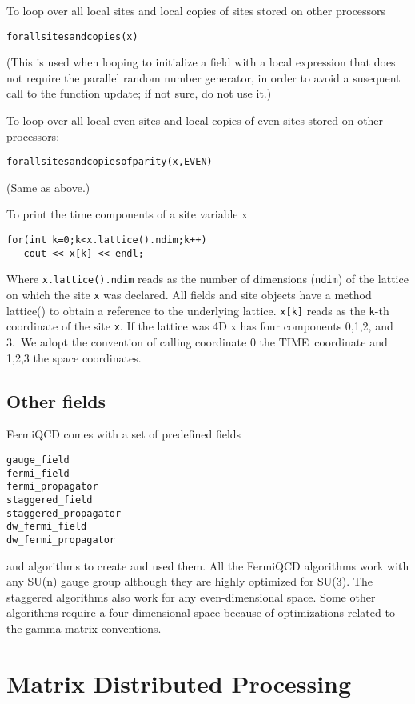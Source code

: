 To loop over all local sites and local copies of sites stored on other
processors
\begin{verbatim}
forallsitesandcopies(x)
\end{verbatim}

(This is used when looping to initialize a field with a local expression
that does not require the parallel random number generator, in order to
avoid a susequent call to the function update; if not sure, do not use it.)

To loop over all local even sites and local copies of even sites stored on
other processors:
\begin{verbatim}
forallsitesandcopiesofparity(x,EVEN)
\end{verbatim}

(Same as above.)

To print the time components of a site variable x
\begin{verbatim}
for(int k=0;k<x.lattice().ndim;k++)
   cout << x[k] << endl;
\end{verbatim}

Where {\tt x.lattice().ndim} reads as the number of dimensions ({\tt ndim})
of the lattice on which the site {\tt x} was declared. All fields and site
objects have a method lattice() to obtain a reference to the underlying
lattice. {\tt x[k]} reads as the {\tt k}-th coordinate of the site {\tt x}.
If the lattice was 4D x has four components 0,1,2, and 3.\ We adopt the
convention of calling coordinate 0 the TIME\ coordinate and 1,2,3 the space
coordinates.

\subsection{Other fields}

FermiQCD comes with a set of predefined fields
\begin{verbatim}
gauge_field
fermi_field
fermi_propagator
staggered_field 
staggered_propagator
dw_fermi_field
dw_fermi_propagator
\end{verbatim}

and algorithms to create and used them. All the FermiQCD algorithms work
with any SU(n) gauge group although they are highly optimized for SU(3). The
staggered algorithms also work for any even-dimensional space. Some other
algorithms require a four dimensional space because of optimizations related
to the gamma matrix conventions.

\section{Matrix Distributed Processing}

